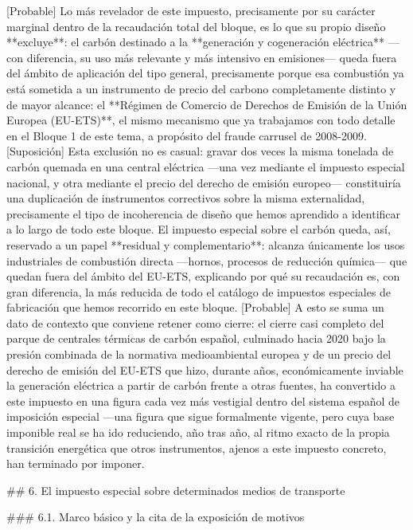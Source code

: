 \documentclass[10pt,a4paper]{article}
\begin{document}
[Probable] Lo más revelador de este impuesto, precisamente por su carácter marginal dentro de la recaudación total del bloque, es lo que su propio diseño **excluye**: el carbón destinado a la **generación y cogeneración eléctrica** —con diferencia, su uso más relevante y más intensivo en emisiones— queda fuera del ámbito de aplicación del tipo general, precisamente porque esa combustión ya está sometida a un instrumento de precio del carbono completamente distinto y de mayor alcance: el **Régimen de Comercio de Derechos de Emisión de la Unión Europea (EU-ETS)**, el mismo mecanismo que ya trabajamos con todo detalle en el Bloque 1 de este tema, a propósito del fraude carrusel de 2008-2009. [Suposición] Esta exclusión no es casual: gravar dos veces la misma tonelada de carbón quemada en una central eléctrica —una vez mediante el impuesto especial nacional, y otra mediante el precio del derecho de emisión europeo— constituiría una duplicación de instrumentos correctivos sobre la misma externalidad, precisamente el tipo de incoherencia de diseño que hemos aprendido a identificar a lo largo de todo este bloque. El impuesto especial sobre el carbón queda, así, reservado a un papel **residual y complementario**: alcanza únicamente los usos industriales de combustión directa —hornos, procesos de reducción química— que quedan fuera del ámbito del EU-ETS, explicando por qué su recaudación es, con gran diferencia, la más reducida de todo el catálogo de impuestos especiales de fabricación que hemos recorrido en este bloque. [Probable] A esto se suma un dato de contexto que conviene retener como cierre: el cierre casi completo del parque de centrales térmicas de carbón español, culminado hacia 2020 bajo la presión combinada de la normativa medioambiental europea y de un precio del derecho de emisión del EU-ETS que hizo, durante años, económicamente inviable la generación eléctrica a partir de carbón frente a otras fuentes, ha convertido a este impuesto en una figura cada vez más vestigial dentro del sistema español de imposición especial —una figura que sigue formalmente vigente, pero cuya base imponible real se ha ido reduciendo, año tras año, al ritmo exacto de la propia transición energética que otros instrumentos, ajenos a este impuesto concreto, han terminado por imponer.



## 6. El impuesto especial sobre determinados medios de transporte

### 6.1. Marco básico y la cita de la exposición de motivos
\end{document}
